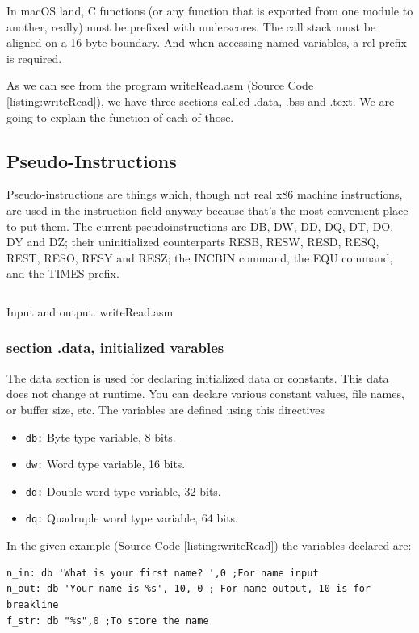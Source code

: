 In macOS land, C functions (or any function that is exported from one module to another, really) must be prefixed with underscores. The call stack must be aligned on a 16-byte boundary. And when accessing named variables, a rel prefix is required.

As we can see from the program writeRead.asm (Source Code \ref{listing:writeRead}), we have three sections called .data, .bss and .text. We are going to explain the function of each of those.

\subsection{Pseudo-Instructions}
Pseudo-instructions are things which, though not real x86 machine instructions, are used in the instruction field anyway because that’s the most convenient place to put them. The current pseudoinstructions are DB, DW, DD, DQ, DT, DO, DY and DZ; their uninitialized counterparts RESB, RESW, RESD, RESQ, REST, RESO, RESY and RESZ; the INCBIN command, the EQU command, and the TIMES prefix.

\begin{listing}[H]
\inputminted{nasm}{code/writeRead.asm}
\caption{Input and output. writeRead.asm}
\label{listing:writeRead}
\end{listing}

\subsubsection{section .data, initialized varables}
The data section is used for declaring initialized data or constants. This data does not change at runtime. You can declare various constant values, file names, or buffer size, etc. The variables are defined using this directives
\begin{itemize}
\item \texttt{db:} Byte type variable, 8 bits.
\item \texttt{dw:} Word type variable, 16 bits.
\item \texttt{dd:} Double word type variable, 32 bits.
\item \texttt{dq:} Quadruple word type variable, 64 bits.
\end{itemize}
In the given example (Source Code \ref{listing:writeRead}) the variables declared are:
\begin{verbatim}
n_in: db 'What is your first name? ',0 ;For name input
n_out: db 'Your name is %s', 10, 0 ; For name output, 10 is for breakline
f_str: db "%s",0 ;To store the name
\end{verbatim}

